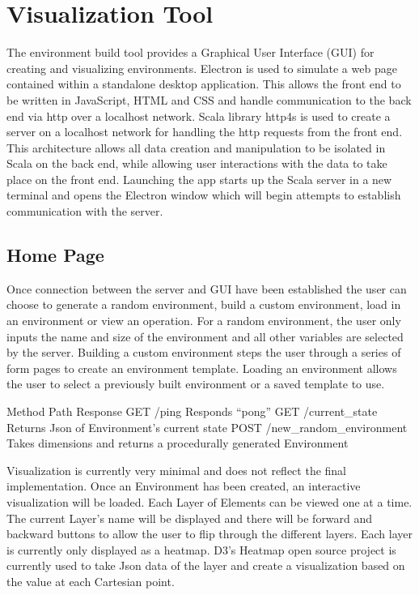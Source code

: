 \section{Visualization Tool}
The environment build tool provides a Graphical User Interface (GUI) for creating and visualizing environments.
Electron  is used to simulate a web page contained within a standalone desktop application.
This allows the front end to be written in JavaScript, HTML and CSS and handle communication to the back end via http over a localhost network.
Scala library http4s  is used to create a server on a localhost network for handling the http requests from the front end.
This architecture allows all data creation and manipulation to be isolated in Scala on the back end, while allowing user interactions with the data to take place on the front end.
Launching the app starts up the Scala server in a new terminal and opens the Electron window which will begin attempts to establish communication with the server.


\subsection{Home Page}
Once connection between the server and GUI have been established the user can choose to generate a random environment, build a custom environment, load in an environment or view an operation. 
For a random environment, the user only inputs the name and size of the environment and all other variables are selected by the server.
Building a custom environment steps the user through a series of form pages to create an environment template.
Loading an environment allows the user to select a previously built environment or a saved template to use.


Method	Path	Response
GET	/ping	Responds “pong”
GET	/current_state	Returns Json of Environment’s current state
POST	/new_random_environment	Takes dimensions and returns a procedurally generated Environment



Visualization is currently very minimal and does not reflect the final implementation.
Once an Environment has been created, an interactive visualization will be loaded.
Each Layer of Elements can be viewed one at a time.
The current Layer’s name will be displayed and there will be forward and backward buttons to allow the user to flip through the different layers.
Each layer is currently only displayed as a heatmap.
D3’s Heatmap open source project is currently used to take Json data of the layer and create a visualization based on the value at each Cartesian point.

